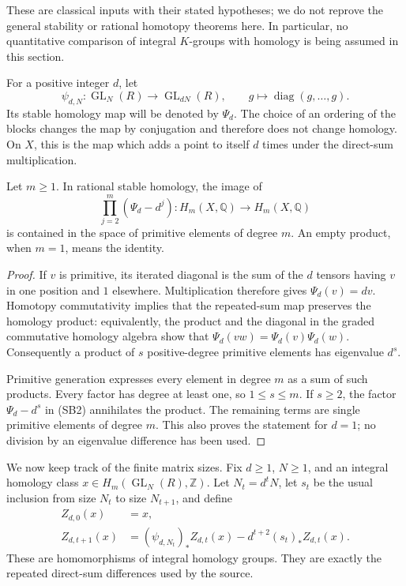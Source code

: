 These are classical inputs with their stated hypotheses;
we do not reprove the general stability or rational
homotopy theorems here.  In particular, no quantitative
comparison of integral \(K\)-groups with homology is being
assumed in this section.

For a positive integer \(d\), let
\[
 \psi_{d,N}:\operatorname{GL}_N(R)
       \longrightarrow\operatorname{GL}_{dN}(R),\qquad
       g\longmapsto\operatorname{diag}(g,\ldots,g).
\]
Its stable homology map will be denoted by \(\Psi_d\).
The choice of an ordering of the blocks changes the map
by conjugation and therefore does not change homology.
On \(X\), this is the map which adds a point to itself
\(d\) times under the direct-sum multiplication.

\begin{lemma}\label{sb-weight}
Let \(m\ge1\).  In rational stable homology, the image of
\[
       \prod_{j=2}^{m}(\Psi_d-d^j)
           :H_m(X,\mathbb Q)\longrightarrow H_m(X,\mathbb Q)
 \tag{SB2}
\]
is contained in the space of primitive elements of degree
\(m\).  An empty product, when \(m=1\), means the identity.
\end{lemma}
\begin{proof}
If \(v\) is primitive, its iterated diagonal is the sum
of the \(d\) tensors having \(v\) in one position and
\(1\) elsewhere.  Multiplication therefore gives
\(\Psi_d(v)=dv\).  Homotopy commutativity implies that
the repeated-sum map preserves the homology product:
equivalently, the product and the diagonal in the graded
commutative homology algebra show that
\(\Psi_d(vw)=\Psi_d(v)\Psi_d(w)\).
Consequently a product of \(s\) positive-degree
primitive elements has eigenvalue \(d^s\).

Primitive generation expresses every element in degree
\(m\) as a sum of such products.  Every factor has
degree at least one, so \(1\le s\le m\).
If \(s\ge2\), the factor \(\Psi_d-d^s\) in (SB2)
annihilates the product.  The remaining terms are single
primitive elements of degree \(m\).  This also proves
the statement for \(d=1\); no division by an eigenvalue
difference has been used.
\end{proof}

We now keep track of the finite matrix sizes.  Fix
\(d\ge1\), \(N\ge1\), and an integral homology class
\(x\in H_m(\operatorname{GL}_N(R),\mathbb Z)\).
Let \(N_t=d^tN\), let \(s_t\) be the usual inclusion
from size \(N_t\) to size \(N_{t+1}\), and define
\[
 \begin{split}
 Z_{d,0}(x)&=x,\\
 Z_{d,t+1}(x)&=(\psi_{d,N_t})_*Z_{d,t}(x)
                         -d^{t+2}(s_t)_*Z_{d,t}(x).
 \end{split}
 \tag{SB3}
\]
These are homomorphisms of integral homology groups.
They are exactly the repeated direct-sum differences
used by the source.

